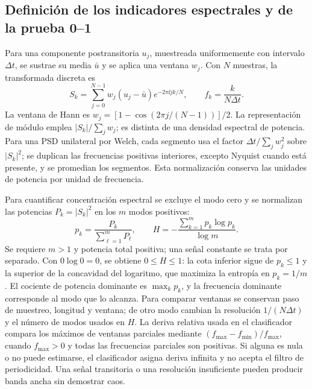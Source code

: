 \subsection{Definición de los indicadores espectrales y de la prueba 0--1}
\label{diag:master:definition}

Para una componente postransitoria $u_j$, muestreada uniformemente con
intervalo $\Delta t$, se sustrae su media $\bar u$ y se aplica una ventana
$w_j$. Con $N$ muestras, la transformada discreta es
\begin{equation}
 S_k=\sum_{j=0}^{N-1}w_j(u_j-\bar u)e^{-2\pi\ii jk/N},
 \qquad f_k=\frac{k}{N\Delta t}.
 \label{diag:master:dft}
\end{equation}
La ventana de Hann es $w_j=[1-\cos(2\pi j/(N-1))]/2$.
La representación de módulo emplea $|S_k|/\sum_jw_j$; es distinta de
una densidad espectral de potencia. Para una PSD unilateral por Welch,
cada segmento usa el factor $\Delta t/\sum_jw_j^2$ sobre $|S_k|^2$;
se duplican las frecuencias positivas interiores, excepto Nyquist
cuando está presente, y se promedian los segmentos. Esta normalización
conserva las unidades de potencia por unidad de frecuencia.

Para cuantificar concentración espectral se excluye el modo cero y se
normalizan las potencias $P_k=|S_k|^2$ en los $m$ modos positivos:
\begin{equation}
 p_k=\frac{P_k}{\sum_{\ell=1}^mP_\ell},\qquad
 H=-\frac{\sum_{k=1}^mp_k\log p_k}{\log m}.
 \label{diag:master:entropy}
\end{equation}
Se requiere $m>1$ y potencia total positiva; una señal constante se trata
por separado. Con $0\log0=0$, se obtiene $0\le H\le1$:
la cota inferior sigue de $p_k\le1$ y la superior de la concavidad del
logaritmo, que maximiza la entropía en $p_k=1/m$.
El cociente de potencia dominante es $\max_kp_k$, y la frecuencia
dominante corresponde al modo que lo alcanza. Para comparar ventanas se
conservan paso de muestreo, longitud y ventana; de otro modo cambian la
resolución $1/(N\Delta t)$ y el número de modos usados en $H$.
La deriva relativa usada en el clasificador compara los máximos de
ventanas parciales mediante $(f_{\max}-f_{\min})/f_{\max}$, cuando
$f_{\max}>0$ y todas las frecuencias parciales son positivas. Si alguna
es nula o no puede estimarse, el clasificador asigna deriva infinita y
no acepta el filtro de periodicidad. Una señal transitoria o una resolución insuficiente pueden
producir banda ancha sin demostrar caos.

